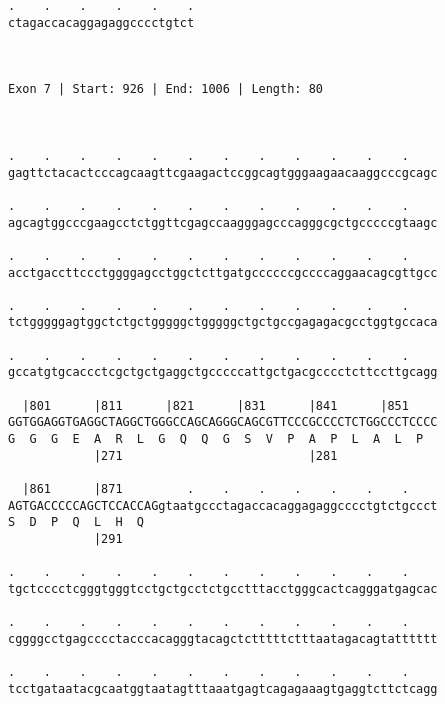 \documentclass{article}
\begin{document}
\begin{Verbatim}
.    .    .    .    .    .
ctagaccacaggagaggcccctgtct
                          
                          
 
Exon 7 | Start: 926 | End: 1006 | Length: 80



.    .    .    .    .    .    .    .    .    .    .    .    
gagttctacactcccagcaagttcgaagactccggcagtgggaagaacaaggcccgcagc
                                                            
.    .    .    .    .    .    .    .    .    .    .    .    
agcagtggcccgaagcctctggttcgagccaagggagcccagggcgctgcccccgtaagc
                                                            
.    .    .    .    .    .    .    .    .    .    .    .    
acctgaccttccctggggagcctggctcttgatgccccccgccccaggaacagcgttgcc
                                                            
.    .    .    .    .    .    .    .    .    .    .    .    
tctgggggagtggctctgctgggggctgggggctgctgccgagagacgcctggtgccaca
                                                            
.    .    .    .    .    .    .    .    .    .    .    .    
gccatgtgcaccctcgctgctgaggctgcccccattgctgacgcccctcttccttgcagg
                                                            
  |801      |811      |821      |831      |841      |851    
GGTGGAGGTGAGGCTAGGCTGGGCCAGCAGGGCAGCGTTCCCGCCCCTCTGGCCCTCCCC
G  G  G  E  A  R  L  G  Q  Q  G  S  V  P  A  P  L  A  L  P  
            |271                          |281              
  
  |861      |871         .    .    .    .    .    .    .    
AGTGACCCCCAGCTCCACCAGgtaatgccctagaccacaggagaggcccctgtctgccct
S  D  P  Q  L  H  Q                                         
            |291                                            
  
.    .    .    .    .    .    .    .    .    .    .    .    
tgctcccctcgggtgggtcctgctgcctctgcctttacctgggcactcagggatgagcac
                                                            
.    .    .    .    .    .    .    .    .    .    .    .    
cggggcctgagcccctacccacagggtacagctctttttctttaatagacagtatttttt
                                                            
.    .    .    .    .    .    .    .    .    .    .    .    
tcctgataatacgcaatggtaatagtttaaatgagtcagagaaagtgaggtcttctcagg
                                                            

\end{Verbatim}
\end{document}
